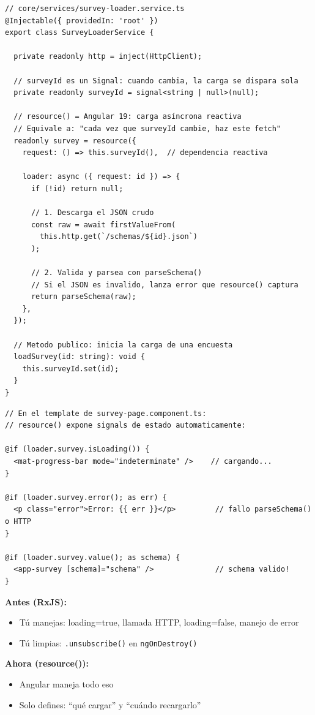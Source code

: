\documentclass[12pt, a4paper]{article}
\begin{document}
\begin{lstlisting}
// core/services/survey-loader.service.ts
@Injectable({ providedIn: 'root' })
export class SurveyLoaderService {

  private readonly http = inject(HttpClient);

  // surveyId es un Signal: cuando cambia, la carga se dispara sola
  private readonly surveyId = signal<string | null>(null);

  // resource() = Angular 19: carga asíncrona reactiva
  // Equivale a: "cada vez que surveyId cambie, haz este fetch"
  readonly survey = resource({
    request: () => this.surveyId(),  // dependencia reactiva

    loader: async ({ request: id }) => {
      if (!id) return null;

      // 1. Descarga el JSON crudo
      const raw = await firstValueFrom(
        this.http.get(`/schemas/${id}.json`)
      );

      // 2. Valida y parsea con parseSchema()
      // Si el JSON es invalido, lanza error que resource() captura
      return parseSchema(raw);
    },
  });

  // Metodo publico: inicia la carga de una encuesta
  loadSurvey(id: string): void {
    this.surveyId.set(id);
  }
}
\end{lstlisting}

\begin{lstlisting}
// En el template de survey-page.component.ts:
// resource() expone signals de estado automaticamente:

@if (loader.survey.isLoading()) {
  <mat-progress-bar mode="indeterminate" />    // cargando...
}

@if (loader.survey.error(); as err) {
  <p class="error">Error: {{ err }}</p>         // fallo parseSchema() o HTTP
}

@if (loader.survey.value(); as schema) {
  <app-survey [schema]="schema" />              // schema valido!
}
\end{lstlisting}

\begin{tcolorbox}[analogia, title={\emoji{hourglass-not-done} \emoji{zap} Resource API vs RxJS Observable}]
  \textbf{Antes (RxJS):}
  \begin{itemize}
    \item {} Tú manejas: loading=true, llamada HTTP, loading=false, manejo de error
    \item {} Tú limpias: \texttt{.unsubscribe()} en \texttt{ngOnDestroy()}
  \end{itemize}
  \textbf{Ahora (resource()):}
  \begin{itemize}
    \item {} Angular maneja todo eso
    \item {} Solo defines: ``qué cargar'' y ``cuándo recargarlo''
  \end{itemize}
\end{tcolorbox}
\end{document}
